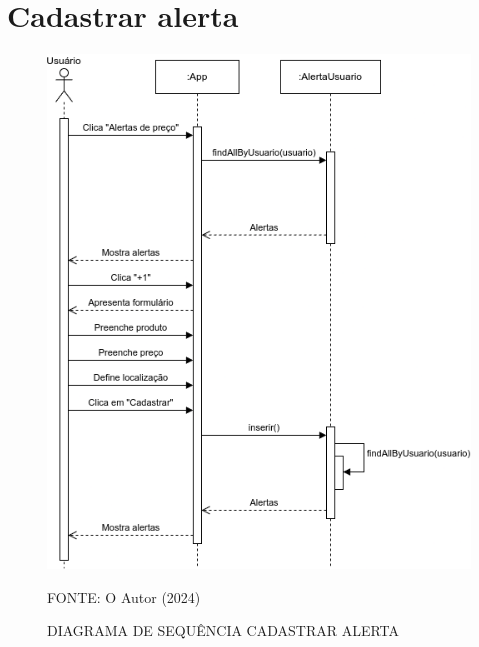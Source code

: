 \section{Cadastrar alerta}
\begin{figure}[H]
    \caption{\label{fig:label} DIAGRAMA DE SEQUÊNCIA CADASTRAR ALERTA}
    \includegraphics[width = 150mm]{fig/sequencia/sequencia4.png}
    \footnotesize \centering
    \par FONTE: O Autor (2024)
\end{figure}









